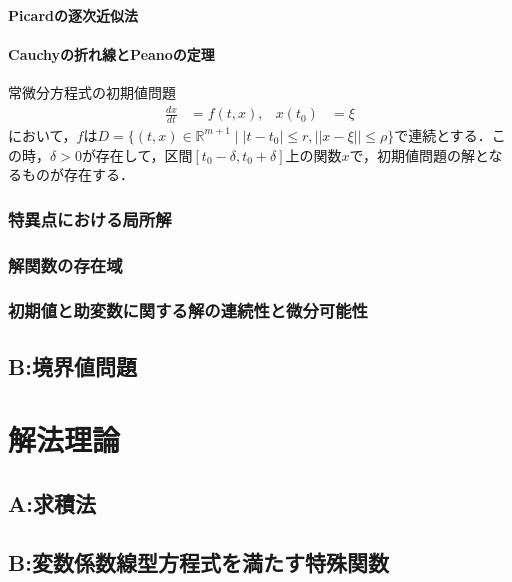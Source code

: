 \documentclass[uplatex,dvipdfmx]{jsreport}
\begin{document}
\subsection{Picardの逐次近似法}

\subsection{Cauchyの折れ線とPeanoの定理}

\begin{theorem}[Peano]
    常微分方程式の初期値問題
    \begin{align*}
        \frac{dx}{dt}&=f(t,x), & x(t_0)&=\xi
    \end{align*}
    において，$f$は$D=\{(t,x)\in\mathbb{R}^{m+1}\mid |t-t_0|\le r,||x-\xi ||\le\rho\}$で連続とする．この時，$\delta>0$が存在して，区間$[t_0-\delta,t_0+\delta]$上の関数$x$で，初期値問題の解となるものが存在する．
\end{theorem}

\section{特異点における局所解}

\section{解関数の存在域}

\section{初期値と助変数に関する解の連続性と微分可能性}

\chapter{B:境界値問題}

\part{解法理論}

\chapter{A:求積法}

\chapter{B:変数係数線型方程式を満たす特殊関数}
\end{document}
